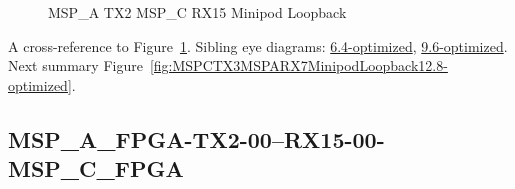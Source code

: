 \begin{figure}[h]
\begin{subfigure}{0.33\textwidth}
\hyperref[sec:MSPAFPGATX206RX1506MSPCFPGA12.8-optimized]{}
\end{subfigure}\hspace*{\fill}
\begin{subfigure}{0.33\textwidth}
\hyperref[sec:MSPAFPGATX207RX1507MSPCFPGA12.8-optimized]{}
\end{subfigure}\hspace*{\fill}
\begin{subfigure}{0.33\textwidth}
\hyperref[sec:MSPAFPGATX208RX1508MSPCFPGA12.8-optimized]{}
\end{subfigure}

\begin{subfigure}{0.33\textwidth}
\hyperref[sec:MSPAFPGATX209RX1509MSPCFPGA12.8-optimized]{}
\end{subfigure}\hspace*{\fill}
\begin{subfigure}{0.33\textwidth}
\hyperref[sec:MSPAFPGATX210RX1510MSPCFPGA12.8-optimized]{}
\end{subfigure}\hspace*{\fill}
\begin{subfigure}{0.33\textwidth}
\hyperref[sec:MSPAFPGATX211RX1511MSPCFPGA12.8-optimized]{}
\end{subfigure}

\caption{MSP\_A TX2 MSP\_C RX15 Minipod Loopback} \label{fig:MSPATX2MSPCRX15MinipodLoopback12.8-optimized}
\end{figure}

A cross-reference to Figure~\ref{fig:MSPATX2MSPCRX15MinipodLoopback12.8-optimized}.
Sibling eye diagrams: \hyperref[sec:MSPATX2MSPCRX15MinipodLoopback6.4-optimized]{6.4-optimized}, \hyperref[sec:MSPATX2MSPCRX15MinipodLoopback9.6-optimized]{9.6-optimized}. \\
Next summary Figure~\ref{fig:MSPCTX3MSPARX7MinipodLoopback12.8-optimized}.
\clearpage
% 
\subsection{MSP\_A\_FPGA-TX2-00--RX15-00-MSP\_C\_FPGA}\label{sec:MSPAFPGATX200RX1500MSPCFPGA12.8-optimized}

